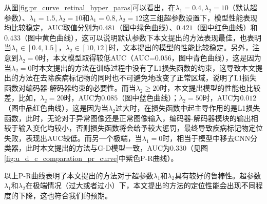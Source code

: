 从图\ref{fig:pr_curve_retinal_hyper_paras}可以看出，在$\lambda_{1}=0.4, \lambda_{2}=10$（默认超参数）、$\lambda_{1}=1.5,\lambda_{2}=10$和$\lambda_{1}=0.8,\lambda_{2}=12$这三组超参数设置下，模型性能表现均比较稳定，AUC取值分别为$0.481$（图中绿色曲线）、$0.421$（图中红色曲线）和$0.433$（图中黄色曲线），这可以说明默认参数下本文提出的方法表现最佳，也表明当$\lambda_{1}\in [0.4,1.5]$，$\lambda_{2}\in [10,12]$时，文本提出的模型的性能比较稳定。另外，注意到$\lambda_{2}=0$时，本文模型取得较低AUC（AUC=$0.056$，图中青色曲线），这是因为当$\lambda_{2}=0$时本文提出的方法在训练过程中没有了L1损失函数的约束，这导致本文提出的方法在去除疾病标记物的同时也不可避免地改变了正常区域，说明了L1损失函数对编码器-解码器约束的必要性。而当$\lambda_{2}\geq 20$时，本文提出模型的性能也比较差，比如，$\lambda_{2}=20$时，AUC为$0.085$（图中蓝色曲线）；$\lambda_{2}=50$时，AUC为$0.012$（图中品红色曲线），这是因为当$\lambda_{2}$过大时，在损失函数中起主导作用的是L1损失函数，此时，无论对于异常图像还是正常图像输入，编码器-解码器模块的输出相较于输入变化均较小，否则损失函数将会给予较大惩罚，最终导致疾病标记物定位失败，表现出AUC较低。而另一个极端，当$\lambda_{1}=0$时，相当于模型中移去CNN分类器，此时本文提出的方法与G-D模型一致，AUC为$0.330$（见图\ref{fig:u_d_c_comparation_pr_curve}中紫色P-R曲线）。

以上P-R曲线表明了本文提出的方法对于超参数$\lambda_{1}$和$\lambda_{2}$具有较好的鲁棒性。超参数$\lambda_{1}$和$\lambda_{2}$在极端情况（过大或者过小）下，本文提出的方法的定位性能会出现不同程度的下降，这也符合我们的预期。

